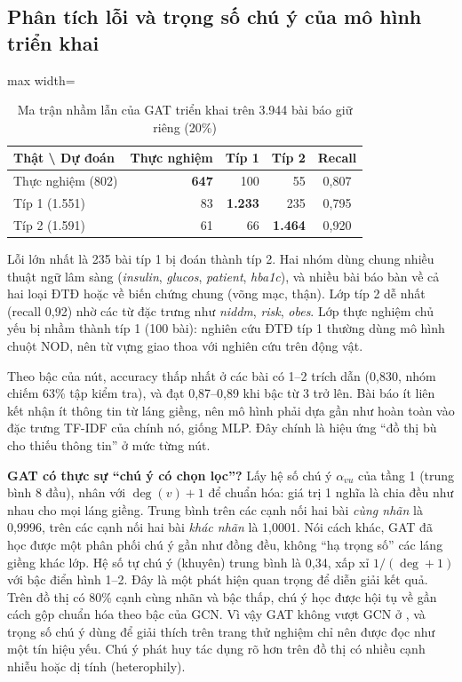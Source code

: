 \subsection{Phân tích lỗi và trọng số chú ý của mô hình triển khai}

\begin{table}[H]
\centering
\caption{Ma trận nhầm lẫn của GAT triển khai trên 3.944 bài báo giữ riêng (20\%)}
\label{tab:ch6-cm}
\small
\begin{adjustbox}{max width=\linewidth}
\begin{tabular}{@{}lrrrc@{}}
\toprule
\textbf{Thật \textbackslash{} Dự đoán} & \textbf{Thực nghiệm} & \textbf{Típ 1} & \textbf{Típ 2} & \textbf{Recall} \\
\midrule
Thực nghiệm (802) & \textbf{647} & 100 & 55 & 0,807 \\
Típ 1 (1.551) & 83 & \textbf{1.233} & 235 & 0,795 \\
Típ 2 (1.591) & 61 & 66 & \textbf{1.464} & 0,920 \\
\bottomrule
\end{tabular}
\end{adjustbox}
\end{table}

Lỗi lớn nhất là 235 bài típ 1 bị đoán thành típ 2. Hai nhóm dùng chung nhiều thuật ngữ lâm sàng (\emph{insulin}, \emph{glucos}, \emph{patient}, \emph{hba1c}), và nhiều bài báo bàn về cả hai loại ĐTĐ hoặc về biến chứng chung (võng mạc, thận). Lớp típ 2 dễ nhất (recall 0,92) nhờ các từ đặc trưng như \emph{niddm}, \emph{risk}, \emph{obes}. Lớp thực nghiệm chủ yếu bị nhầm thành típ 1 (100 bài): nghiên cứu ĐTĐ típ 1 thường dùng mô hình chuột NOD, nên từ vựng giao thoa với nghiên cứu trên động vật.

Theo bậc của nút, accuracy thấp nhất ở các bài có 1–2 trích dẫn (0,830, nhóm chiếm 63\% tập kiểm tra), và đạt 0,87–0,89 khi bậc từ 3 trở lên. Bài báo ít liên kết nhận ít thông tin từ láng giềng, nên mô hình phải dựa gần như hoàn toàn vào đặc trưng TF-IDF của chính nó, giống MLP. Đây chính là hiệu ứng ``đồ thị bù cho thiếu thông tin'' ở mức từng nút.

\textbf{GAT có thực sự ``chú ý có chọn lọc''?} Lấy hệ số chú ý $\alpha_{vu}$ của tầng 1 (trung bình 8 đầu), nhân với $\deg(v)+1$ để chuẩn hóa: giá trị 1 nghĩa là chia đều như nhau cho mọi láng giềng. Trung bình trên các cạnh nối hai bài \emph{cùng nhãn} là 0,9996, trên các cạnh nối hai bài \emph{khác nhãn} là 1,0001. Nói cách khác, GAT đã học được một phân phối chú ý gần như đồng đều, không ``hạ trọng số'' các láng giềng khác lớp. Hệ số tự chú ý (khuyên) trung bình là 0,34, xấp xỉ $1/(\deg+1)$ với bậc điển hình 1–2. Đây là một phát hiện quan trọng để diễn giải kết quả. Trên đồ thị có 80\% cạnh cùng nhãn và bậc thấp, chú ý học được hội tụ về gần cách gộp chuẩn hóa theo bậc của GCN. Vì vậy GAT không vượt GCN ở , và trọng số chú ý dùng để giải thích trên trang thử nghiệm chỉ nên được đọc như một tín hiệu yếu. Chú ý phát huy tác dụng rõ hơn trên đồ thị có nhiều cạnh nhiễu hoặc dị tính (heterophily).

